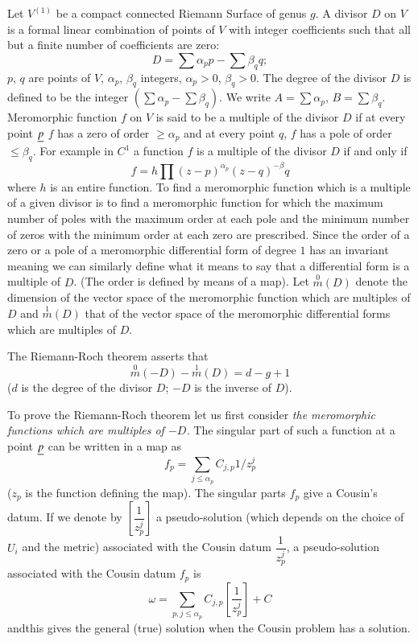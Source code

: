 Let $V^{(1)}$ be a compact connected Riemann Surface of genus $g$. A
divisor $D$ on $V$ is a formal linear combination of points of $V$
with integer coefficients such that all but a finite number of
coefficients are zero:
$$
D=\sum\alpha_{p}p-\sum\beta_{q}q;
$$
$p$, $q$ are points of $V$, $\alpha_{p}$, $\beta_{q}$ integers,
$\alpha_{p}>0$, $\beta_{q}>0$. The degree of the divisor $D$ is
defined to be the integer $(\sum\alpha_{p}-\sum\beta_{q})$. We write
$A=\sum\alpha_{p}$, $B=\sum\beta_{q}$. Meromorphic function $f$ on $V$
is said to be a multiple of the divisor $D$ if at every point $\underline{p}$
$f$ has a zero of order $\geq \alpha_{p}$ and at every point $q$, $f$
has a pole of order $\leq \beta_{q}$. For example in $C^{1}$ a
function $f$ is a multiple of the divisor $D$ if and only if
$$
f=h\prod (z-p)^{\alpha_{p}}(z-q)^{-\beta}q
$$
where $h$ is an entire function. To find a meromorphic function which
is a multiple of a given divisor is to find a meromorphic function for
which the maximum number of poles with the maximum order at each pole
and the minimum number of zeros with the minimum order at each zero
are prescribed. Since the order of a zero or a pole of a\pageoriginale
meromorphic differential form of degree $1$ has an invariant meaning
we can similarly define what it means to say that a differential form
is a multiple of $D$. (The order is defined by means of a map). Let
$\overset{0}{m}(D)$ denote the dimension of the vector space of the
meromorphic function which are multiples of $D$ and
$\overset{1}{m}(D)$ that of the vector space of the meromorphic
differential forms which are multiples of $D$.

The Riemann-Roch theorem asserts that
$$
\boxed{\overset{0}{m}(-D)-\overset{1}{m}(D)=d-g+1}
$$
($d$ is the degree of the divisor $D$; $-D$ is the inverse of $D$).

To prove the Riemann-Roch theorem let us first consider {\em the
  meromorphic functions which are multiples of $-D$.} The singular
part of such a function at a point $\underline{p}$ can be written in a map as
$$
f_{p}=\sum_{j\leq \alpha_{p}}C_{j,p}1/z^{j}_{p}
$$
($z_{p}$ is the function defining the map). The singular parts $f_{p}$
give a Cousin's datum. If we denote by $[\dfrac{1}{z^{j}_{p}}]$ a
pseudo-solution (which depends on the choice of $U_{i}$ and the
metric) associated with the Cousin datum $\dfrac{1}{z^{j}_{p}}$, a
pseudo-solution associated with the Cousin datum $f_{p}$ is
$$
\omega=\sum_{p,j\leq \alpha_{p}}C_{j,p}[\frac{1}{z^{j}_{p}}]+C
$$
and\pageoriginale this gives the general (true) solution when the
Cousin problem has a solution.

